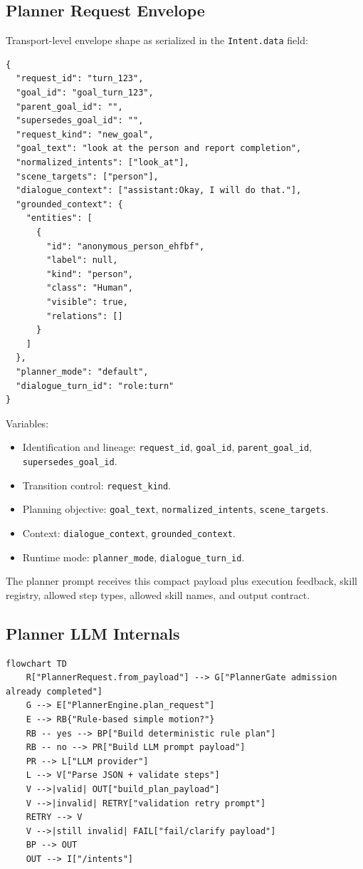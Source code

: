 \documentclass[12pt,a4paper]{article}
\newcommand{\code}[1]{\texttt{#1}}
\begin{document}
\subsection{Planner Request Envelope}

Transport-level envelope shape as serialized in the \code{Intent.data} field:

\begin{lstlisting}
{
  "request_id": "turn_123",
  "goal_id": "goal_turn_123",
  "parent_goal_id": "",
  "supersedes_goal_id": "",
  "request_kind": "new_goal",
  "goal_text": "look at the person and report completion",
  "normalized_intents": ["look_at"],
  "scene_targets": ["person"],
  "dialogue_context": ["assistant:Okay, I will do that."],
  "grounded_context": {
    "entities": [
      {
        "id": "anonymous_person_ehfbf",
        "label": null,
        "kind": "person",
        "class": "Human",
        "visible": true,
        "relations": []
      }
    ]
  },
  "planner_mode": "default",
  "dialogue_turn_id": "role:turn"
}
\end{lstlisting}

Variables:

\begin{itemize}
\item Identification and lineage: \code{request\_id}, \code{goal\_id}, \code{parent\_goal\_id}, \code{supersedes\_goal\_id}.
\item Transition control: \code{request\_kind}.
\item Planning objective: \code{goal\_text}, \code{normalized\_intents}, \code{scene\_targets}.
\item Context: \code{dialogue\_context}, \code{grounded\_context}.
\item Runtime mode: \code{planner\_mode}, \code{dialogue\_turn\_id}.
\end{itemize}

The planner prompt receives this compact payload plus execution feedback, skill registry, allowed step types, allowed skill names, and output contract.



\subsection{Planner LLM Internals}

\begin{lstlisting}[caption={Diagram source from canonical Markdown}]
flowchart TD
    R["PlannerRequest.from_payload"] --> G["PlannerGate admission already completed"]
    G --> E["PlannerEngine.plan_request"]
    E --> RB{"Rule-based simple motion?"}
    RB -- yes --> BP["Build deterministic rule plan"]
    RB -- no --> PR["Build LLM prompt payload"]
    PR --> L["LLM provider"]
    L --> V["Parse JSON + validate steps"]
    V -->|valid| OUT["build_plan_payload"]
    V -->|invalid| RETRY["validation retry prompt"]
    RETRY --> V
    V -->|still invalid| FAIL["fail/clarify payload"]
    BP --> OUT
    OUT --> I["/intents"]
\end{lstlisting}
\end{document}
